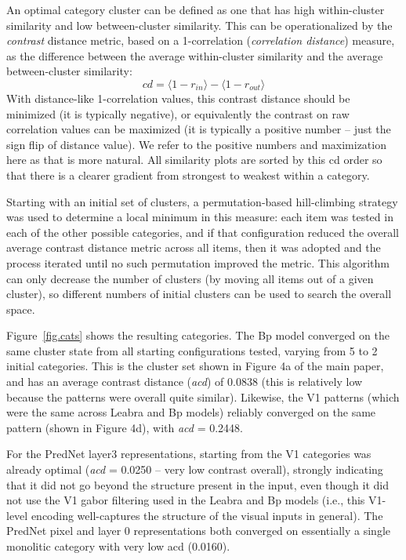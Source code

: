 \documentclass[12pt,twoside]{article}
\newif\myifpdf
\begin{document}
An optimal category cluster can be defined as one that has high within-cluster similarity and low between-cluster similarity.  This can be operationalized by the {\em contrast} distance metric, based on a 1-correlation ({\em correlation distance}) measure, as the difference between the average within-cluster similarity and the average between-cluster similarity:
\begin{equation}
 cd = \langle 1-r_{in} \rangle - \langle 1-r_{out} \rangle 
\end{equation}
With distance-like 1-correlation values, this contrast distance should be minimized (it is typically negative), or equivalently the contrast on raw correlation values can be maximized (it is typically a positive number -- just the sign flip of distance value).  We refer to the positive numbers and maximization here as that is more natural.  All similarity plots are sorted by this cd order so that there is a clearer gradient from strongest to weakest within a category.

Starting with an initial set of clusters, a permutation-based hill-climbing strategy was used to determine a local minimum in this measure: each item was tested in each of the other possible categories, and if that configuration reduced the overall average contrast distance metric across all items, then it was adopted and the process iterated until no such permutation improved the metric.  This algorithm can only decrease the number of clusters (by moving all items out of a given cluster), so different numbers of initial clusters can be used to search the overall space.

Figure~\ref{fig.cats} shows the resulting categories. The Bp model converged on the same cluster state from all starting configurations tested, varying from 5 to 2 initial categories.  This is the cluster set shown in Figure 4a of the main paper, and has an average contrast distance ({\em acd}) of 0.0838 (this is relatively low because the patterns were overall quite similar).  Likewise, the V1 patterns (which were the same across Leabra and Bp models) reliably converged on the same pattern (shown in Figure 4d), with {\em acd} = 0.2448.

For the PredNet layer3 representations, starting from the V1 categories was already optimal ({\em acd} = 0.0250 -- very low contrast overall), strongly indicating that it did not go beyond the structure present in the input, even though it did not use the V1 gabor filtering used in the Leabra and Bp models (i.e., this V1-level encoding well-captures the structure of the visual inputs in general).  The PredNet pixel and layer 0 representations both converged on essentially a single monolitic category with very low acd (0.0160).
\end{document}
